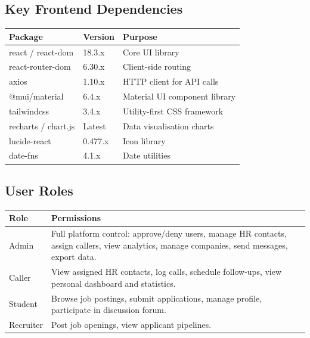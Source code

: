 \documentclass[12pt,a4paper]{article}
\begin{document}
\subsection{Key Frontend Dependencies}

\begin{longtable}{p{5cm} p{2.5cm} p{6.5cm}}
    \toprule
    \textbf{Package} & \textbf{Version} & \textbf{Purpose} \\
    \midrule
    \endhead
    
    react / react-dom        & 18.3.x   & Core UI library \\
    react-router-dom         & 6.30.x   & Client-side routing \\
    axios                    & 1.10.x   & HTTP client for API calls \\
    @mui/material            & 6.4.x    & Material UI component library \\
    tailwindcss              & 3.4.x    & Utility-first CSS framework \\
    recharts / chart.js      & Latest   & Data visualisation charts \\
    lucide-react             & 0.477.x  & Icon library \\
    date-fns                 & 4.1.x    & Date utilities \\
    
    \bottomrule
\end{longtable}

\subsection{User Roles}

\begin{longtable}{p{3cm} p{11cm}}
    \toprule
    \textbf{Role} & \textbf{Permissions} \\
    \midrule
    \endhead
    
    Admin     & Full platform control: approve/deny users, manage HR contacts, assign callers, view analytics, manage companies, send messages, export data. \\
    Caller    & View assigned HR contacts, log calls, schedule follow-ups, view personal dashboard and statistics. \\
    Student   & Browse job postings, submit applications, manage profile, participate in discussion forum. \\
    Recruiter & Post job openings, view applicant pipelines. \\
    
    \bottomrule
\end{longtable}
\end{document}
